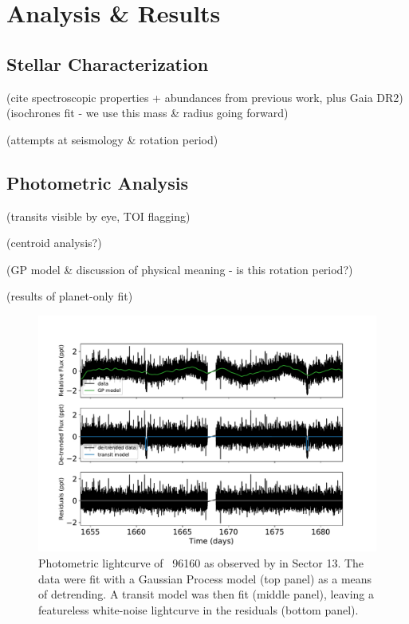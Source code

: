\documentclass[modern]{aastex62}
\newcommand{\hoststar}{\acronym{HIP}\ 96160\xspace}
\begin{document}
\section{Analysis \& Results}
\label{s:analysis}

\subsection{Stellar Characterization}
\label{s:analysis:star}


(cite spectroscopic properties + abundances from previous work, plus Gaia DR2)
(isochrones fit - we use this mass \& radius going forward)

(attempts at seismology \& rotation period)

\subsection{Photometric Analysis}
\label{s:analysis:photometry}


(transits visible by eye, TOI flagging)

(centroid analysis?)

(GP model \& discussion of physical meaning - is this rotation period?)

(results of planet-only fit)

\begin{figure}
    \centering
    \includegraphics[width=\textwidth]{lightcurve.pdf}
    \caption{Photometric lightcurve of \hoststar as observed by \TESS in Sector 13. The \TESS data were fit with a Gaussian Process model (top panel) as a means of detrending. A transit model was then fit (middle panel), leaving a featureless white-noise lightcurve in the residuals (bottom panel).}
    \label{fig:lightcurve}
\end{figure}
\end{document}
